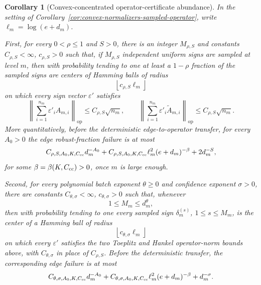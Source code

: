 \documentclass[11pt]{amsart}
\numberwithin{equation}{section}
\newtheorem{corollary}[theorem]{Corollary}
\theoremstyle{definition}
\theoremstyle{remark}
\newcommand{\op}{\mathrm{op}}
\newcommand{\eps}{\varepsilon}
\begin{document}
\begin{corollary}[Convex-concentrated operator-certificate abundance]
\label{cor:convex-normalizers-operator-abundance}
In the setting of Corollary~\ref{cor:convex-normalizers-sampled-operator}, write
\(\ell_m=\log(e+d_m)\).

First, for every \(0<\rho\le1\) and \(S>0\), there is an integer
\(M_{\rho,S}\) and constants \(C_{\rho,S}<\infty\), \(c_{\rho,S}>0\) such that,
if \(M_{\rho,S}\) independent uniform signs are sampled at level \(m\), then
with probability tending to one at least a \(1-\rho\) fraction of the sampled
signs are centers of Hamming balls of radius
\[
  \left\lfloor c_{\rho,S}\ell_m\right\rfloor
\]
on which every sign vector \(\eps'\) satisfies
\[
  \left\|\sum_{i=1}^{n_m}\eps'_iA_{m,i}\right\|_{\op}
  \le C_{\rho,S}\sqrt{n_m},
  \qquad
  \left\|\sum_{i=1}^{n_m}\eps'_i\widetilde A_{m,i}\right\|_{\op}
  \le C_{\rho,S}\sqrt{n_m}.
\]
More quantitatively, before the deterministic edge-to-operator transfer, for
every \(A_0>0\) the edge robust-fraction failure is at most
\[
  C_{\rho,S,A_0,K,C_{\rm cc}}d_m^{-A_0}
  +C_{\rho,S,A_0,K,C_{\rm cc}}\ell_m^2(e+d_m)^{-\beta}
  +2d_m^{-S},
\]
for some \(\beta=\beta(K,C_{\rm cc})>0\), once \(m\) is large enough.

Second, for every polynomial batch exponent \(\theta\ge0\) and confidence
exponent \(\sigma>0\), there are constants
\(C_{\theta,\sigma}<\infty\), \(c_{\theta,\sigma}>0\) such that, whenever
\[
  1\le M_m\le d_m^\theta,
\]
then with probability tending to one every sampled sign
\(\delta_m^{(s)}\), \(1\le s\le M_m\), is the center of a Hamming ball of
radius
\[
  \left\lfloor c_{\theta,\sigma}\ell_m\right\rfloor
\]
on which every \(\eps'\) satisfies the two Toeplitz and Hankel operator-norm
bounds above, with \(C_{\theta,\sigma}\) in place of \(C_{\rho,S}\).  Before
the deterministic transfer, the corresponding edge failure is at most
\[
  C_{\theta,\sigma,A_0,K,C_{\rm cc}}d_m^{-A_0}
  +C_{\theta,\sigma,A_0,K,C_{\rm cc}}\ell_m^2(e+d_m)^{-\beta}
  +d_m^{-\sigma}.
\]
\end{corollary}
\end{document}
